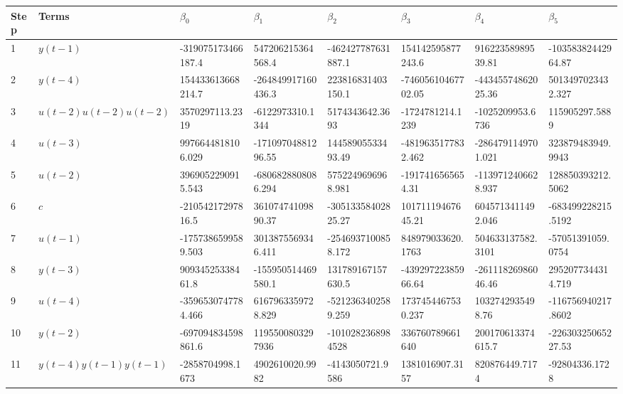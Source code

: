 \begin{tabular}{llllllll}
Step & Terms & $\beta_{0}$ & $\beta_{1}$ & $\beta_{2}$ & $\beta_{3}$ & $\beta_{4}$ & $\beta_{5}$ \\ 
\hline 
1 & $y(t-1)$ & -319075173466187.4 & 547206215364568.4 & -462427787631887.1 & 154142595877243.6 & 91622358989539.81 & -10358382442964.87 \\ 
2 & $y(t-4)$ & 154433613668214.7 & -264849917160436.3 & 223816831403150.1 & -74605610467702.05 & -44345574862025.36 & 5013497023432.327 \\ 
3 & $u(t-2)u(t-2)u(t-2)$ & 3570297113.2319 & -6122973310.1344 & 5174343642.3693 & -1724781214.1239 & -1025209953.6736 & 115905297.5889 \\ 
4 & $u(t-3)$ & 9976644818106.029 & -17109704881296.55 & 14458905533493.49 & -4819635177832.462 & -2864791149701.021 & 323879483949.9943 \\ 
5 & $u(t-2)$ & 3969052290915.543 & -6806828808086.294 & 5752249696968.981 & -1917416565654.31 & -1139712406628.937 & 128850393212.5062 \\ 
6 & $c$ & -21054217297816.5 & 36107474109890.37 & -30513358402825.27 & 10171119467645.21 & 6045713411492.046 & -683499228215.5192 \\ 
7 & $u(t-1)$ & -1757386599589.503 & 3013875569346.411 & -2546937100858.172 & 848979033620.1763 & 504633137582.3101 & -57051391059.0754 \\ 
8 & $y(t-3)$ & 90934525338461.8 & -155950514469580.1 & 131789167157630.5 & -43929722385966.64 & -26111826986046.46 & 2952077344314.719 \\ 
9 & $u(t-4)$ & -3596530747784.466 & 6167963359728.829 & -5212363402589.259 & 1737454467530.237 & 1032742935498.76 & -116756940217.8602 \\ 
10 & $y(t-2)$ & -697094834598861.6 & 1195500803297936 & -1010282368984528 & 336760789661640 & 200170613374615.7 & -22630325065227.53 \\ 
11 & $y(t-4)y(t-1)y(t-1)$ & -2858704998.1673 & 4902610020.9982 & -4143050721.9586 & 1381016907.3157 & 820876449.7174 & -92804336.1728 \\ 
\hline 
\end{tabular}